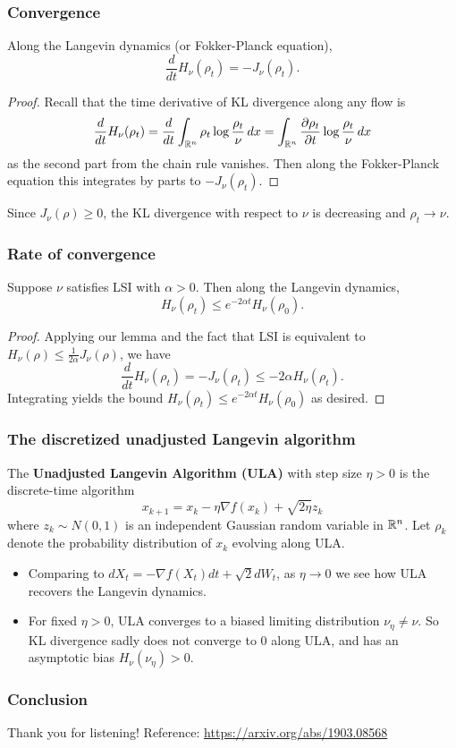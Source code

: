 \documentclass[xcolor=dvipsnames]{beamer}
\begin{document}
    \begin{frame}
    \frametitle{Convergence} 
    \begin{lemma}
        Along the Langevin dynamics (or Fokker-Planck equation), \[
        \frac{d}{dt}H_{\nu}(\rho _t)=-J_{\nu}(\rho _t).
        \] 
    \end{lemma}
    \begin{proof}
        Recall that the time derivative of KL divergence along any flow is \[
        \frac{d}{dt}H_{\nu}(\rho_t)=\frac{d}{dt}\int_{\mathbb{R}^n }^{}\rho_t \log \frac{\rho_t}{\nu}  \, dx = \int_{\mathbb{R}^n } \frac{\partial \rho_t }{\partial  t} \log \frac{\rho_t}{\nu}\, dx
        \] as the second part from the chain rule vanishes. Then along the Fokker-Planck equation this integrates by parts to $-J_{\nu}(\rho_t)$.
    \end{proof}
    Since $J_{\nu}(\rho) \geq 0$, the KL divergence with respect to  $\nu$ is decreasing and $\rho_t \to  \nu$.
    \end{frame}


    \begin{frame}
        \frametitle{Rate of convergence} 
        \begin{theorem}
            Suppose $\nu$ satisfies LSI with $\alpha >0$. Then along the Langevin dynamics, \[
           H_{\nu}(\rho _t)\leq e ^{-2 \alpha t}H_{\nu}(\rho_{0}). 
            \] 
        \end{theorem}
        \begin{proof}
            Applying our lemma and the fact that LSI is equivalent to $H_{\nu}(\rho) \leq \frac{1}{2\alpha }J_{\nu}(\rho)$, we have \[
            \frac{d}{dt}H_{\nu}(\rho_t)=-J_{\nu}(\rho_t) \leq -2\alpha  H_{\nu}(\rho_t).
            \] Integrating yields the bound $H_{\nu}(\rho_t)\leq  e ^{-2\alpha t }H_{\nu}(\rho_0)$ as desired.
        \end{proof}
    \end{frame}

    \begin{frame}
        \frametitle{The discretized unadjusted Langevin algorithm} 
        \begin{definition}[]
            The \textbf{Unadjusted Langevin Algorithm (ULA)} with step size $\eta >0 $ is the discrete-time algorithm  \[
            x_{k+1}=x_k-\eta \nabla f(x_k) + \sqrt{2 \eta} z_k
            \] where $z_k \sim N(0,1)$ is an independent Gaussian random variable in  $\mathbb{R}^n $. Let $\rho_k$ denote the probability distribution of  $x_k$ evolving along ULA.
        \end{definition}
        \begin{itemize}
        \setlength\itemsep{-.2em}
            \item Comparing to $d X_{t}= - \nabla f (X_{t})dt + \sqrt{ 2 } d W_{t}$, as $\eta \to  0$ we see how ULA recovers the Langevin dynamics.
            \item For fixed $\eta>0$, ULA converges to a biased limiting distribution  $\nu_{\eta}\neq \nu$. So KL divergence sadly does not converge to 0 along ULA, and has an asymptotic bias $H_{\nu}(\nu_{\eta})> 0$.
        \end{itemize}
        
    \end{frame}

\begin{frame}
    \frametitle{Conclusion} 
    Thank you for listening! Reference: \url{https://arxiv.org/abs/1903.08568}
\end{frame}
\end{document}
